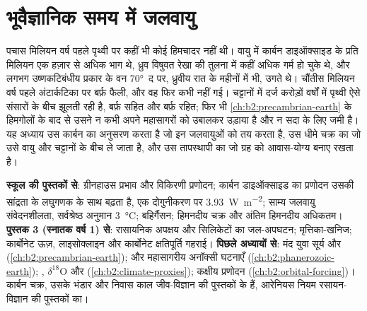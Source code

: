 \chapter{भूवैज्ञानिक समय में जलवायु}\label{ch:b2:deep-time-climate}

पचास मिलियन वर्ष पहले पृथ्वी पर कहीं भी कोई हिमचादर नहीं थी। वायु में कार्बन डाइऑक्साइड के प्रति मिलियन एक
हज़ार से अधिक भाग थे, ध्रुव विषुवत रेखा की तुलना में कहीं अधिक गर्म हो चुके थे, और
लगभग उष्णकटिबंधीय प्रकार के वन \ang{70}~द पर, ध्रुवीय रात के महीनों में भी, उगते थे। चौंतीस
मिलियन वर्ष पहले अंटार्कटिका पर बर्फ़ फैली, और वह फिर कभी नहीं गई। चट्टानों में दर्ज करोड़ों
वर्षों में पृथ्वी ऐसे संसारों के बीच झूलती रही है, बर्फ़ सहित और बर्फ़ रहित; फिर भी
\cref{ch:b2:precambrian-earth} के हिमगोलों के बाद से उसने न कभी अपने महासागरों को उबालकर उड़ाया
है और न सदा के लिए जमी है। यह अध्याय उस कार्बन का अनुसरण करता है जो इन जलवायुओं को तय करता है, उस धीमे
चक्र का जो उसे वायु और चट्टानों के बीच ले जाता है, और उस तापस्थापी का जो ग्रह को
आवास-योग्य बनाए रखता है।

\begin{recall}
\textbf{स्कूल की पुस्तकों से}: ग्रीनहाउस प्रभाव और विकिरणी प्रणोदन; कार्बन
डाइऑक्साइड का प्रणोदन उसकी सांद्रता के लघुगणक के साथ बढ़ता है, एक दोगुनीकरण पर \qty{3.93}{W.m^{-2}};
साम्य जलवायु संवेदनशीलता, सर्वश्रेष्ठ अनुमान \qty{3}{\celsius}; बहिर्गैसन; हिमनदीय चक्र
और अंतिम हिमनदीय अधिकतम। \textbf{पुस्तक 3 (स्नातक वर्ष 1) से}: रासायनिक अपक्षय और
सिलिकेटों का जल-अपघटन; मृत्तिका-खनिज; कार्बोनेट ऊज़, लाइसोक्लाइन और कार्बोनेट
क्षतिपूर्ति गहराई। \textbf{पिछले अध्यायों से}: मंद युवा सूर्य और 
(\cref{ch:b2:precambrian-earth});  और महासागरीय अनॉक्सी घटनाएँ
(\cref{ch:b2:phanerozoic-earth}); , $\delta^{18}$O और 
(\cref{ch:b2:climate-proxies}); कक्षीय प्रणोदन (\cref{ch:b2:orbital-forcing})। कार्बन चक्र,
उसके भंडार और निवास काल जीव-विज्ञान की पुस्तकों के हैं, आरेनियस नियम
रसायन-विज्ञान की पुस्तकों का।
\end{recall}

